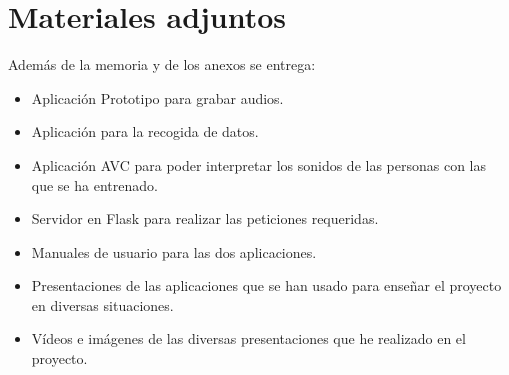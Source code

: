 \section{Materiales adjuntos}
Además de la memoria y de los anexos se entrega:
\begin{itemize}
	\item Aplicación Prototipo para grabar audios.
	\item Aplicación para la recogida de datos.
	\item Aplicación AVC para poder interpretar los sonidos de las personas con las que se ha entrenado.
	\item Servidor en Flask para realizar las peticiones requeridas.
	\item Manuales de usuario para las dos aplicaciones.
	\item Presentaciones de las aplicaciones que se han usado para enseñar el proyecto en diversas situaciones.
	\item Vídeos e imágenes de las diversas presentaciones que he realizado en el proyecto.
\end{itemize}	